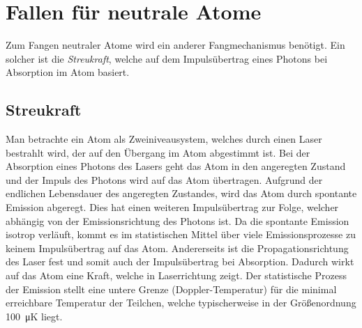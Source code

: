 \documentclass[twocolumn]{revtex4}
\begin{document}
\section{Fallen für neutrale Atome}
Zum Fangen neutraler Atome wird ein anderer Fangmechanismus benötigt.
Ein solcher ist die \emph{Streukraft}, welche auf dem Impulsübertrag eines Photons bei Absorption im Atom basiert.

\subsection{Streukraft}
Man betrachte ein Atom als Zweiniveausystem, welches durch einen Laser bestrahlt wird, der auf den Übergang im Atom abgestimmt ist.
Bei der Absorption eines Photons des Lasers geht das Atom in den angeregten Zustand und der Impuls des Photons wird auf das Atom übertragen.
Aufgrund der endlichen Lebensdauer des angeregten Zustandes, wird das Atom durch spontante Emission abgeregt. 
Dies hat einen weiteren Impulsübertrag zur Folge, welcher abhängig von der Emissionsrichtung des Photons ist.
Da die spontante Emission isotrop verläuft, kommt es im statistischen Mittel über viele Emissionsprozesse zu keinem Impulsübertrag auf das Atom.
Andererseits ist die Propagationsrichtung des Laser fest und somit auch der Impulsübertrag bei Absorption.
Dadurch wirkt auf das Atom eine Kraft, welche in Laserrichtung zeigt.
Der statistische Prozess der Emission stellt eine untere Grenze (Doppler-Temperatur) für die minimal erreichbare Temperatur der Teilchen, welche typischerweise in der Größenordnung \SI{100}{\micro\kelvin} liegt.
\end{document}
